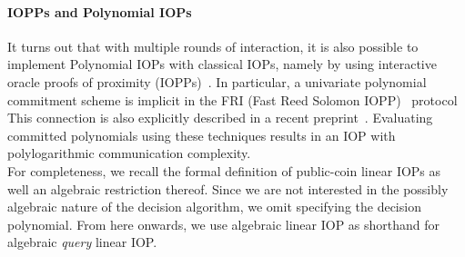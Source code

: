 
\paragraph{IOPPs and Polynomial IOPs} It turns out that with multiple rounds of interaction, it is also possible to implement Polynomial IOPs with classical IOPs, namely by using interactive oracle proofs of proximity (IOPPs)~\cite{STOC:ReiRotRot16,TCC:BenChiSpo16}. In particular, a univariate polynomial commitment scheme is implicit in the FRI (Fast Reed Solomon IOPP)~\cite{ICALP:BBHR18} protocol 
This connection is also explicitly described in a recent preprint~\cite{MatterLabs}. Evaluating committed polynomials using these techniques results in an IOP with polylogarithmic communication complexity.\\

For completeness, we recall the formal definition of public-coin linear IOPs as well an algebraic restriction thereof. Since we are not interested in the possibly algebraic nature of the decision algorithm, we omit specifying the decision polynomial. From here onwards, we use algebraic linear IOP as shorthand for algebraic \emph{query} linear IOP. %

